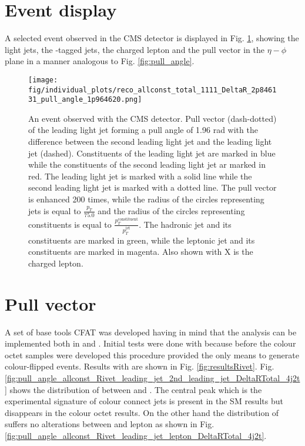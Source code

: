 \section{Event display}
A selected event observed in the CMS detector is displayed in Fig. \ref{fig:event_display}, showing the light jets, the \cPqb-tagged jets, the charged lepton and the pull vector in the $\eta - \phi$ plane in a manner analogous to Fig. \ref{fig:pull_angle}.

\begin{figure}[hbtp]
  \centering
  \texttt{[image: fig/individual\_plots/reco\_allconst\_total\_1111\_DeltaR\_2p846131\_pull\_angle\_1p964620.png]}
  \caption{An event observed with the CMS detector. Pull vector (dash-dotted) of the leading light jet forming a pull angle of 1.96 rad with the difference between the second leading light jet and the leading light jet (dashed). Constituents of the leading light jet are marked in blue while the constituents of the second leading light jet ar marked in red. The leading light jet is marked with a solid line while the second leading light jet is marked with a dotted line. The pull vector is enhanced 200 times, while the radius of the circles representing jets is equal to $\frac{p_{T}}{75.0}$ and the radius of the circles representing constituents is equal to $\frac{p^{\text{constituent}}_{T}}{p^{\text{jet}}_{T}}$. The hadronic \cPqb jet and its constituents are marked in green, while the leptonic \cPqb jet and its constituents are marked in magenta. Also shown with X is the charged lepton.}
  \label{fig:event_display}
\end{figure}

\section{Pull vector}

A set of base tools \textsc{CFAT} \cite{url:cfat} was developed having in mind that the analysis can be implemented both in \RIVET and \CMSSW. Initial tests were done with \RIVET because before the colour octet \PW samples were developed this procedure provided the only means to generate colour-flipped events. Results with \RIVET are shown in Fig. \ref{fig:resultsRivet}. Fig. \ref{fig:pull_angle_allconst_Rivet_leading_jet_2nd_leading_jet_DeltaRTotal_4j2t} shows the distribution of \pullangle between \leadingjet and \scndleadingjet. The central peak which is the experimental signature of colour connect jets is present in the SM results but disappears in the \PW colour octet results. On the other hand the distribution of \pullangle suffers no alterations between \leadingjet and lepton as shown in Fig. \ref{fig:pull_angle_allconst_Rivet_leading_jet_lepton_DeltaRTotal_4j2t}.

